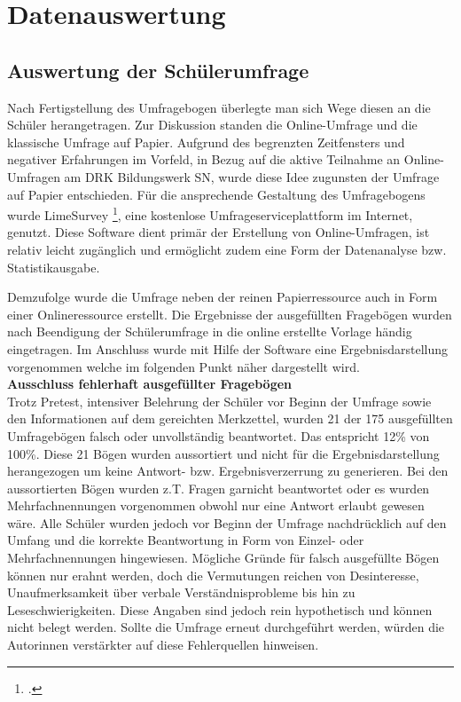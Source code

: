 \section{Datenauswertung}
\label{sec:Datenauswertung}

\subsection{Auswertung der Schülerumfrage}
\label{sec:AuswertungDerSchülerumfrage}

Nach Fertigstellung des Umfragebogen überlegte man sich Wege diesen an die Schüler herangetragen. Zur Diskussion standen die Online-Umfrage und die klassische Umfrage auf Papier. Aufgrund des begrenzten Zeitfensters und negativer Erfahrungen im Vorfeld, in Bezug auf die aktive Teilnahme an Online-Umfragen am DRK Bildungswerk SN, wurde diese Idee zugunsten der Umfrage auf Papier entschieden. Für die ansprechende Gestaltung des Umfragebogens wurde LimeSurvey \footcite {LimeSurvey2015}, eine kostenlose Umfrageserviceplattform im Internet, genutzt. Diese Software dient primär der Erstellung von Online-Umfragen, ist relativ leicht zugänglich und ermöglicht zudem eine Form der Datenanalyse bzw. Statistikausgabe.

Demzufolge wurde die Umfrage neben der reinen Papierressource auch in Form einer Onlineressource erstellt. Die Ergebnisse der ausgefüllten Fragebögen wurden nach Beendigung der Schülerumfrage in die online erstellte Vorlage händig eingetragen. Im Anschluss wurde mit Hilfe der Software eine Ergebnisdarstellung vorgenommen welche im folgenden Punkt näher dargestellt wird.\\

\textbf{Ausschluss fehlerhaft ausgefüllter Fragebögen}\\
Trotz Pretest, intensiver Belehrung der Schüler vor Beginn der Umfrage sowie den Informationen auf dem gereichten Merkzettel, wurden 21 der 175 ausgefüllten Umfragebögen falsch oder unvollständig beantwortet. Das entspricht 12\% von 100\%.  Diese 21 Bögen wurden aussortiert und nicht für die Ergebnisdarstellung herangezogen um keine Antwort- bzw. Ergebnisverzerrung zu generieren. Bei den aussortierten Bögen wurden z.T. Fragen garnicht beantwortet oder es wurden Mehrfachnennungen vorgenommen obwohl nur eine Antwort erlaubt gewesen wäre. Alle Schüler wurden jedoch vor Beginn der Umfrage nachdrücklich auf den Umfang und die korrekte Beantwortung in Form von Einzel- oder Mehrfachnennungen hingewiesen. Mögliche Gründe für falsch ausgefüllte Bögen können nur erahnt werden, doch die Vermutungen reichen von Desinteresse, Unaufmerksamkeit über verbale Verständnisprobleme bis hin zu Leseschwierigkeiten. Diese Angaben sind jedoch rein hypothetisch und können nicht belegt werden. Sollte die Umfrage erneut durchgeführt werden, würden die Autorinnen verstärkter auf diese Fehlerquellen hinweisen. 

